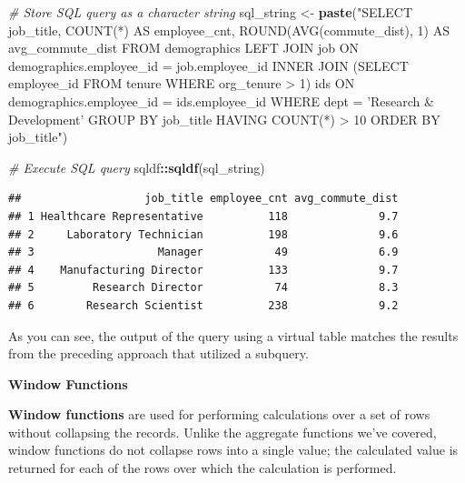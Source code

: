 \documentclass[]{book}
\newenvironment{Shaded}{\begin{snugshade}}{\end{snugshade}}
\newcommand{\CommentTok}[1]{\textcolor[rgb]{0.56,0.35,0.01}{\textit{#1}}}
\newcommand{\KeywordTok}[1]{\textcolor[rgb]{0.13,0.29,0.53}{\textbf{#1}}}
\newcommand{\NormalTok}[1]{#1}
\newcommand{\OperatorTok}[1]{\textcolor[rgb]{0.81,0.36,0.00}{\textbf{#1}}}
\newcommand{\StringTok}[1]{\textcolor[rgb]{0.31,0.60,0.02}{#1}}
\begin{document}
\begin{Shaded}
\begin{Highlighting}[]
\CommentTok{# Store SQL query as a character string}
\NormalTok{sql_string <-}\StringTok{ }\KeywordTok{paste}\NormalTok{(}\StringTok{"SELECT}
\StringTok{                      job_title,}
\StringTok{                      COUNT(*) AS employee_cnt,}
\StringTok{                      ROUND(AVG(commute_dist), 1) AS avg_commute_dist}
\StringTok{                    FROM}
\StringTok{                        demographics}
\StringTok{                      LEFT JOIN}
\StringTok{                        job}
\StringTok{                      ON}
\StringTok{                        demographics.employee_id = job.employee_id}
\StringTok{                      INNER JOIN}
\StringTok{                        (SELECT employee_id FROM tenure WHERE org_tenure > 1) ids}
\StringTok{                      ON}
\StringTok{                        demographics.employee_id = ids.employee_id}
\StringTok{                    WHERE}
\StringTok{                      dept = 'Research & Development'}
\StringTok{                    GROUP BY}
\StringTok{                      job_title}
\StringTok{                    HAVING}
\StringTok{                      COUNT(*) > 10}
\StringTok{                    ORDER BY}
\StringTok{                      job_title"}\NormalTok{)}

\CommentTok{# Execute SQL query}
\NormalTok{sqldf}\OperatorTok{::}\KeywordTok{sqldf}\NormalTok{(sql_string)}
\end{Highlighting}
\end{Shaded}

\begin{verbatim}
##                   job_title employee_cnt avg_commute_dist
## 1 Healthcare Representative          118              9.7
## 2     Laboratory Technician          198              9.6
## 3                   Manager           49              6.9
## 4    Manufacturing Director          133              9.7
## 5         Research Director           74              8.3
## 6        Research Scientist          238              9.2
\end{verbatim}

As you can see, the output of the query using a virtual table matches the results from the preceding approach that utilized a subquery.

\textbf{Window Functions}

\textbf{Window functions} are used for performing calculations over a set of rows without collapsing the records. Unlike the aggregate functions we've covered, window functions do not collapse rows into a single value; the calculated value is returned for each of the rows over which the calculation is performed.
\end{document}
